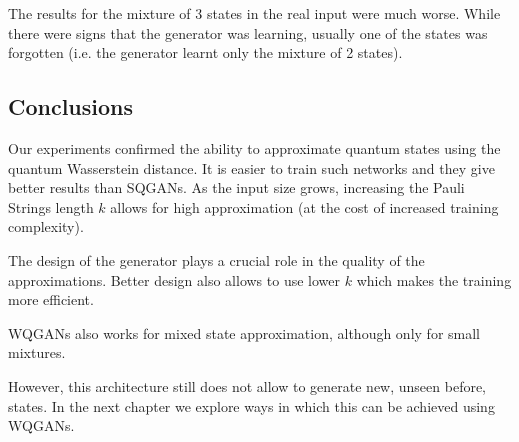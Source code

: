The results for the mixture of 3 states in the real input were much worse. While
there were signs that the generator was learning, usually one of the
states was forgotten (i.e. the generator learnt only the mixture of 2 states).

\subsection{Conclusions}
Our experiments confirmed the ability to approximate quantum states using the
quantum Wasserstein distance. It is easier to train such networks and they give
better results than SQGANs. As the input size grows, increasing the Pauli
Strings length $k$ allows for high approximation (at the cost of increased
training complexity).

The design of the generator plays a crucial role in the quality of the
approximations. Better design also allows to use lower $k$ which makes the
training more efficient.

WQGANs also works for mixed state approximation, although only for small
mixtures.

However, this architecture still does not allow to generate new, unseen before,
states. In the next chapter we explore ways in which this can be achieved using WQGANs. 

